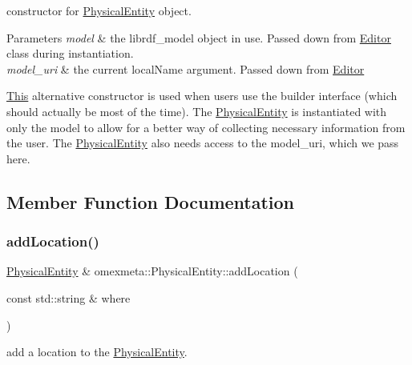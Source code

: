 constructor for \hyperlink{classomexmeta_1_1PhysicalEntity}{Physical\+Entity} object. 


\begin{DoxyParams}{Parameters}
{\em model} & the librdf\+\_\+model object in use. Passed down from \hyperlink{classomexmeta_1_1Editor}{Editor} class during instantiation. \\
\hline
{\em model\+\_\+uri} & the current local\+Name argument. Passed down from \hyperlink{classomexmeta_1_1Editor}{Editor}\\
\hline
\end{DoxyParams}
\hyperlink{classThis}{This} alternative constructor is used when users use the builder interface (which should actually be most of the time). The \hyperlink{classomexmeta_1_1PhysicalEntity}{Physical\+Entity} is instantiated with only the model to allow for a better way of collecting necessary information from the user. The \hyperlink{classomexmeta_1_1PhysicalEntity}{Physical\+Entity} also needs access to the model\+\_\+uri, which we pass here. 

\subsection{Member Function Documentation}
\mbox{\label{classomexmeta_1_1PhysicalEntity_a82e77be3327c537b2426b571afaa5045}} 
\subsubsection{\texorpdfstring{add\+Location()}{addLocation()}}
{\footnotesize\ttfamily \hyperlink{classomexmeta_1_1PhysicalEntity}{Physical\+Entity} \& omexmeta\+::\+Physical\+Entity\+::add\+Location (\begin{DoxyParamCaption}\item[{const std\+::string \&}]{where }\end{DoxyParamCaption})}



add a location to the \hyperlink{classomexmeta_1_1PhysicalEntity}{Physical\+Entity}. 


